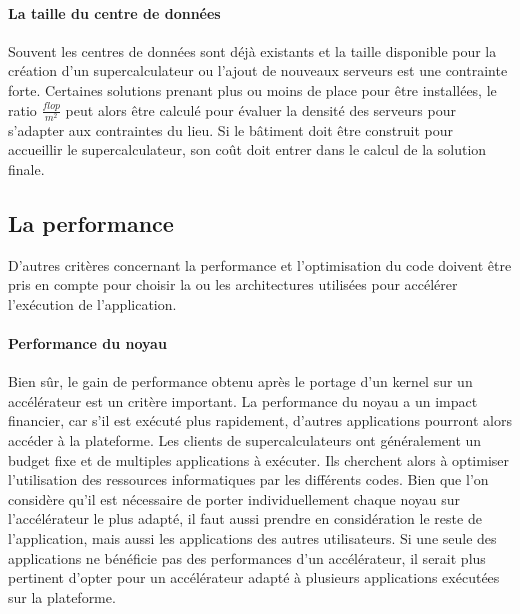     \paragraph{La taille du centre de données} 
        Souvent les centres de données sont déjà existants et la taille disponible pour la création d'un supercalculateur ou l'ajout de nouveaux serveurs est une contrainte forte. Certaines solutions prenant plus ou moins de place pour être installées, le ratio $\frac{flop}{m^2}$ peut alors être calculé pour évaluer la densité des serveurs pour s'adapter aux contraintes du lieu. Si le bâtiment doit être construit pour accueillir le supercalculateur, son coût doit entrer dans le calcul de la solution finale.




\subsection{La performance}
    D'autres critères concernant la performance et l'optimisation du code doivent être pris en compte pour choisir la ou les architectures utilisées pour accélérer l'exécution de l'application.
    
    \paragraph{Performance du noyau}
        Bien sûr, le gain de performance obtenu après le portage d'un \gls{kernel} sur un accélérateur est un critère important.
        La performance du noyau a un impact financier, car s'il est exécuté plus rapidement, d'autres applications pourront alors accéder à la plateforme. Les clients de supercalculateurs ont généralement un budget fixe et de multiples applications à exécuter. Ils cherchent alors à optimiser l'utilisation des ressources informatiques par les différents codes. Bien que l'on considère qu'il est nécessaire de porter individuellement chaque noyau sur l'accélérateur le plus adapté, il faut aussi prendre en considération le reste de l'application, mais aussi les applications des autres utilisateurs. Si une seule des applications ne bénéficie pas des performances d'un accélérateur, il serait plus pertinent d'opter pour un accélérateur adapté à plusieurs applications exécutées sur la plateforme. 
    
     
